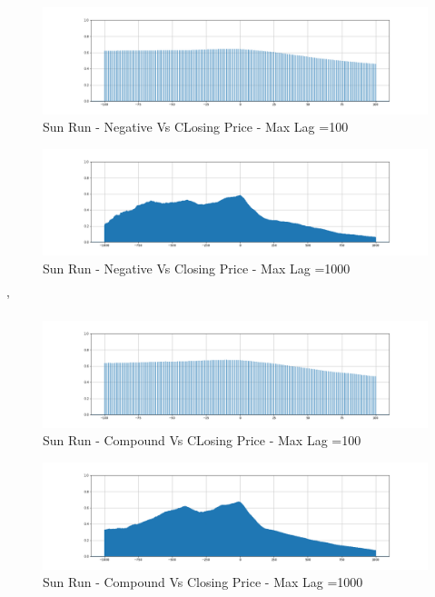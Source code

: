 \documentclass[sigconf, nonacm]{acmart}
\begin{document}



\begin{figure}[H]
  \centering
  \includegraphics[width=\linewidth]{images/srun_100_pos.png}
  \caption{Sun Run - Negative Vs CLosing Price - Max Lag =100}
\end{figure}

\begin{figure}[H]
  \centering
  \includegraphics[width=\linewidth]{images/srun_1000_neg.png}
  \caption{Sun Run - Negative Vs Closing Price - Max Lag =1000}
\end{figure}

'%
\begin{figure}[H]
  \centering
  \includegraphics[width=\linewidth]{images/srun_100_comp.png}
  \caption{Sun Run - Compound Vs CLosing Price - Max Lag =100}
\end{figure}

\begin{figure}[H]
  \centering
  \includegraphics[width=\linewidth]{images/srun_1000_comp.png}
  \caption{Sun Run - Compound Vs Closing Price - Max Lag =1000}
\end{figure}
\end{document}
